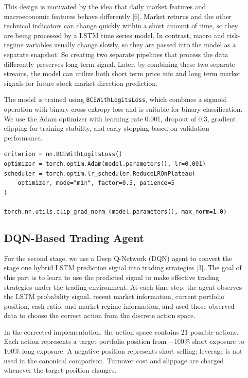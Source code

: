 \documentclass{article}
\begin{document}
This design is motivated by the idea that daily market features and macroeconomic features behave differently [6]. Market returns and the other technical indicators can change quickly within a short amount of time, so they are being processed by a LSTM time series model. In contrast, macro and risk-regime variables usually change slowly, so they are passed into the model as a separate snapshot. So creating two separate pipelines that process the data differently preserves long term signal. Later, by combining these two separate streams, the model can utilize both short term price info and long term market signals for future stock market direction prediction.

The model is trained using \texttt{BCEWithLogitsLoss}, which combines a sigmoid operation with binary cross-entropy loss and is suitable for binary classification. We use the Adam optimizer with learning rate 0.001, dropout of 0.3, gradient clipping for training stability, and early stopping based on validation performance.


\begin{verbatim}
criterion = nn.BCEWithLogitsLoss()
optimizer = torch.optim.Adam(model.parameters(), lr=0.001)
scheduler = torch.optim.lr_scheduler.ReduceLROnPlateau(
    optimizer, mode="min", factor=0.5, patience=5
)

torch.nn.utils.clip_grad_norm_(model.parameters(), max_norm=1.0)
\end{verbatim}
   
\subsection{DQN-Based Trading Agent}

For the second stage, we use a Deep Q-Network (DQN) agent to convert the stage one hybrid LSTM prediction signal into trading strategies [3]. The goal of this part is to learn to use the predicted signal to make effective trading strategies under the trading environment. At each time step, the agent observes the LSTM probability signal, recent market information, current portfolio position, cash ratio, and market regime information, and used those observed data to choose the correct action from the discrete action space.

In the corrected implementation, the action space contains 21 possible actions. Each action represents a target portfolio position from $-100\%$ short exposure to $100\%$ long exposure. A negative position represents short selling; leverage is not used in the canonical comparison. Turnover cost and slippage are charged whenever the target position changes.
\end{document}
